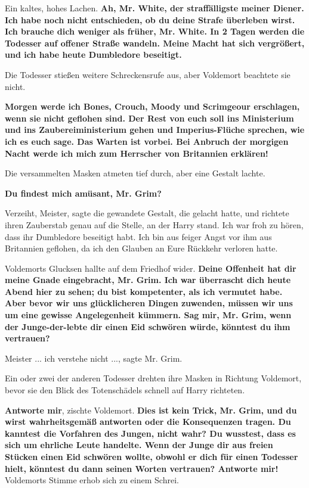 Ein kaltes, hohes Lachen. \glqq{}\textbf{Ah, Mr. White, der straffälligste meiner
Diener. Ich habe noch nicht entschieden, ob du deine Strafe überleben wirst. Ich
brauche dich weniger als früher, Mr. White. In 2 Tagen werden die Todesser auf
offener Straße wandeln. Meine Macht hat sich vergrößert, und ich habe heute
Dumbledore beseitigt.}\grqq{}

Die Todesser stießen weitere Schreckensrufe aus, aber Voldemort beachtete sie
nicht.

\glqq{}\textbf{Morgen werde ich Bones, Crouch, Moody und Scrimgeour erschlagen,
wenn sie nicht geflohen sind. Der Rest von euch soll ins Ministerium und ins
Zaubereiministerium gehen und Imperius-Flüche sprechen, wie ich es euch sage.
Das Warten ist vorbei. Bei Anbruch der morgigen Nacht werde ich mich zum
Herrscher von Britannien erklären!}\grqq{}

Die versammelten Masken atmeten tief durch, aber eine Gestalt lachte.

\glqq{}\textbf{Du findest mich amüsant, Mr. Grim?}\grqq{}

\glqq{}Verzeiht, Meister\grqq{}, sagte die gewandete Gestalt, die gelacht hatte,
und richtete ihren Zauberstab genau auf die Stelle, an der Harry stand. \glqq{}
Ich war froh zu hören, dass ihr Dumbledore beseitigt habt. Ich bin aus feiger
Angst vor ihm aus Britannien geflohen, da ich den Glauben an Eure Rückkehr
verloren hatte.\grqq{}

Voldemorts Glucksen hallte auf dem Friedhof wider. \glqq{}\textbf{Deine Offenheit
hat dir meine Gnade eingebracht, Mr. Grim. Ich war überrascht dich heute Abend
hier zu sehen; du bist kompetenter, als ich vermutet habe. Aber bevor wir uns
glücklicheren Dingen zuwenden, müssen wir uns um eine gewisse Angelegenheit
kümmern. Sag mir, Mr. Grim, wenn der Junge-der-lebte dir einen Eid schwören
würde, könntest du ihm vertrauen?}\grqq{}

\glqq{}Meister ... ich verstehe nicht ...\grqq{}, sagte Mr. Grim.

Ein oder zwei der anderen Todesser drehten ihre Masken in Richtung Voldemort,
bevor sie den Blick des Totenschädels schnell auf Harry richteten.

\glqq{}\textbf{Antworte mir}\grqq{}, zischte Voldemort. \glqq{}\textbf{Dies ist
kein Trick, Mr. Grim, und du wirst wahrheitsgemäß antworten oder die
Konsequenzen tragen. Du kanntest die Vorfahren des Jungen, nicht wahr? Du
wusstest, dass es sich um ehrliche Leute handelte. Wenn der Junge dir aus freien
Stücken einen Eid schwören wollte, obwohl er dich für einen Todesser hielt,
könntest du dann seinen Worten vertrauen? Antworte mir!}\grqq{} Voldemorts Stimme
erhob sich zu einem Schrei.

